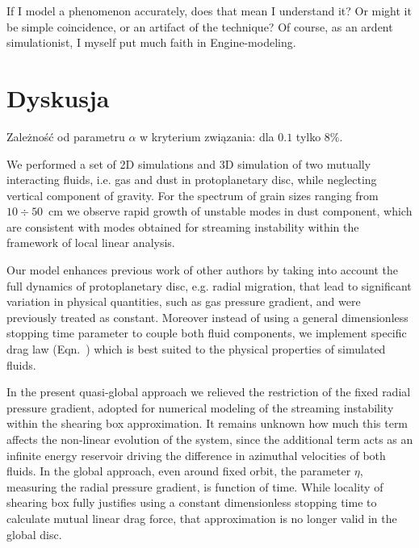 \begin{savequote}[75mm]
   If I model a phenomenon accurately, does that mean I understand it? Or might it be simple coincidence, or an artifact
   of the technique? Of course, as an ardent simulationist, I myself put much faith in Engine-modeling.
\end{savequote}

\chapter{Dyskusja}

Zależność od parametru $\alpha$ w kryterium związania: dla $0.1$ tylko $8\%$.

We performed a set of 2D simulations and 3D simulation of two mutually
interacting fluids, i.e. gas and dust in protoplanetary disc, while neglecting
vertical component of gravity. For the spectrum of grain sizes ranging from
$10\div50$~cm we observe rapid growth of unstable modes in dust component, which
are consistent with modes obtained for streaming instability within the
framework of local linear analysis.

Our model enhances previous work of other authors by taking into account the
full dynamics of protoplanetary disc, e.g. radial migration, that lead to
significant variation in physical quantities, such as gas pressure gradient, and
were previously treated as constant. Moreover instead of using a general
dimensionless stopping time parameter to couple both fluid components, we
implement specific drag law (Eqn.~) which is best suited to the
physical properties of simulated fluids.

\par In the present quasi-global approach we relieved the restriction of the
fixed  radial pressure gradient, adopted for numerical modeling of the streaming
instability within the shearing box approximation.  It remains unknown how much
this term affects the non-linear evolution of the system, since the additional
term acts as an infinite energy reservoir driving the difference in azimuthal
velocities of both fluids. In the global approach, even around fixed orbit, the
parameter $\eta$, measuring the radial pressure gradient, is function of time.
While locality of shearing box fully justifies using a constant dimensionless
stopping time to calculate mutual linear drag force, that approximation is no
longer valid in the global disc. 

